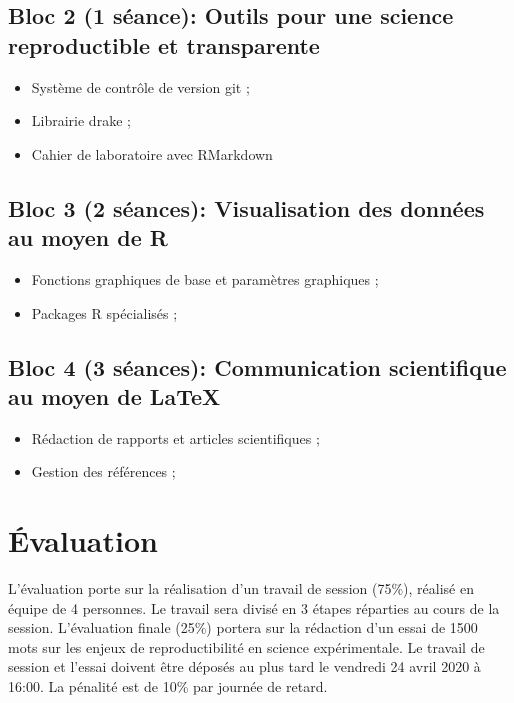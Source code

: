 \documentclass[12]{article}
\begin{document}
	\subsection*{Bloc 2 (1 séance): Outils pour une science reproductible et transparente}

	\begin{itemize}
	\renewcommand{\labelitemi}{$\bullet$}	
		\item Système de contrôle de version git ;
		\item Librairie drake ; 
		\item Cahier de laboratoire avec RMarkdown
	\end{itemize}


	\subsection*{Bloc 3 (2 séances): Visualisation des données au moyen de R}

	\begin{itemize}
	\renewcommand{\labelitemi}{$\bullet$}	
		\item Fonctions graphiques de base et paramètres graphiques ;
		\item Packages R spécialisés ;
	\end{itemize}


	\subsection*{Bloc 4 (3 séances): Communication scientifique au moyen de LaTeX}

	\begin{itemize}
	\renewcommand{\labelitemi}{$\bullet$}	
		\item Rédaction de rapports et articles scientifiques ;
		\item Gestion des références ;
	\end{itemize}


	\section*{Évaluation}

	L'évaluation porte sur la réalisation d'un travail de session (75\%), réalisé en équipe de 4 personnes. Le travail sera divisé en 3 étapes réparties au cours de la session. L'évaluation finale (25\%) portera sur la rédaction d'un essai de 1500 mots sur les enjeux de reproductibilité en science expérimentale. Le travail de session et l'essai doivent être déposés au plus tard le vendredi 24 avril 2020 à 16:00. La pénalité est de 10\% par journée de retard.  
\end{document}
